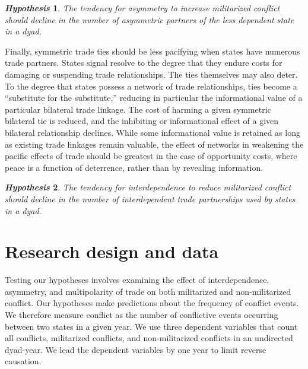 \documentclass[12pt]{article}
\theoremstyle{hypothesis}
\newtheorem{hypothesis}{\it Hypothesis}
\begin{document}
\begin{hypothesis}
\begin{minipage}[t]{5.5 in}

\upshape The tendency for asymmetry to increase militarized conflict should decline in the number of asymmetric partners of the less dependent state in a dyad. \end{minipage}
\end{hypothesis}

Finally, symmetric trade ties should be less pacifying when states have numerous trade partners.  States signal resolve to the degree that they endure costs for damaging or suspending trade relationships.  The ties themselves may also deter.  To the degree that states possess a network of trade relationships, ties become a ``substitute for the substitute,'' reducing in particular the informational value of a particular bilateral trade linkage.  The cost of harming a given symmetric bilateral tie is reduced, and the inhibiting or informational effect of a given bilateral relationship declines.  While some informational value is retained as long as existing trade linkages remain valuable, the effect of networks in weakening the pacific effects of trade should be greatest in the case of opportunity costs, where peace is a function of deterrence, rather than by revealing information.

\begin{hypothesis}
\begin{minipage}[t]{5.5 in}
\upshape The tendency for interdependence to reduce militarized conflict should decline in the number of interdependent trade partnerships used by states in a dyad.
\end{minipage}
\end{hypothesis}

\section*{Research design and data}

Testing our hypotheses involves examining the effect of interdependence, asymmetry, and multipolarity of trade on both militarized and non-militarized conflict. Our hypotheses make predictions about the frequency of conflict events. We therefore measure conflict as the number of conflictive events occurring between two states in a given year. We use three dependent variables that count all conflicts, militarized conflicts, and non-militarized conflicts in an undirected dyad-year. We lead the dependent variables by one year to limit reverse causation.
\end{document}
